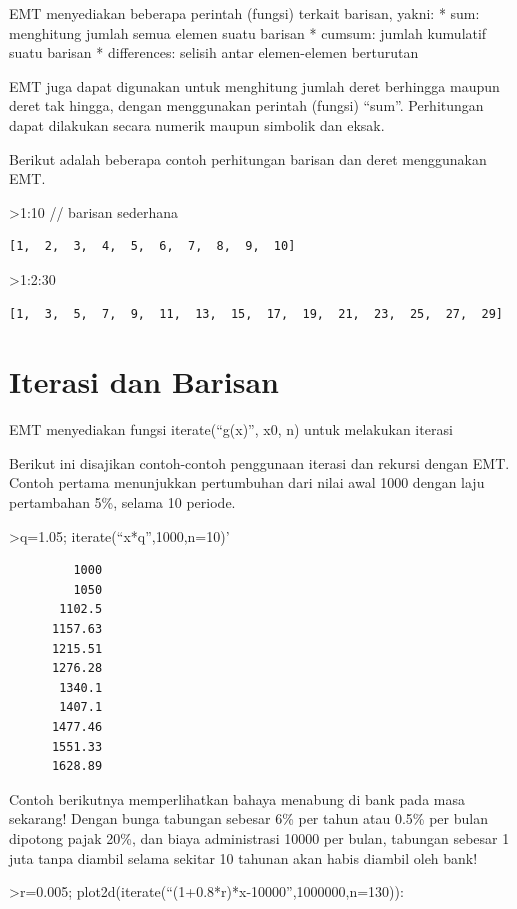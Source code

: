 \documentclass[
]{book}
\begin{document}
EMT menyediakan beberapa perintah (fungsi) terkait barisan, yakni: * sum: menghitung jumlah semua elemen suatu barisan * cumsum: jumlah kumulatif suatu barisan * differences: selisih antar elemen-elemen berturutan

EMT juga dapat digunakan untuk menghitung jumlah deret berhingga maupun deret tak hingga, dengan menggunakan perintah (fungsi) ``sum''. Perhitungan dapat dilakukan secara numerik maupun simbolik dan eksak.

Berikut adalah beberapa contoh perhitungan barisan dan deret menggunakan EMT.

\textgreater1:10 // barisan sederhana

\begin{verbatim}
[1,  2,  3,  4,  5,  6,  7,  8,  9,  10]
\end{verbatim}

\textgreater1:2:30

\begin{verbatim}
[1,  3,  5,  7,  9,  11,  13,  15,  17,  19,  21,  23,  25,  27,  29]
\end{verbatim}

\section{Iterasi dan Barisan}\label{iterasi-dan-barisan}

EMT menyediakan fungsi iterate(``g(x)'', x0, n) untuk melakukan iterasi

Berikut ini disajikan contoh-contoh penggunaan iterasi dan rekursi dengan EMT. Contoh pertama menunjukkan pertumbuhan dari nilai awal 1000 dengan laju pertambahan 5\%, selama 10 periode.

\textgreater q=1.05; iterate(``x*q'',1000,n=10)'

\begin{verbatim}
         1000 
         1050 
       1102.5 
      1157.63 
      1215.51 
      1276.28 
       1340.1 
       1407.1 
      1477.46 
      1551.33 
      1628.89 
\end{verbatim}

Contoh berikutnya memperlihatkan bahaya menabung di bank pada masa sekarang! Dengan bunga tabungan sebesar 6\% per tahun atau 0.5\% per bulan dipotong pajak 20\%, dan biaya administrasi 10000 per bulan, tabungan sebesar 1 juta tanpa diambil selama sekitar 10 tahunan akan habis diambil oleh bank!

\textgreater r=0.005; plot2d(iterate(``(1+0.8*r)*x-10000'',1000000,n=130)):
\end{document}
